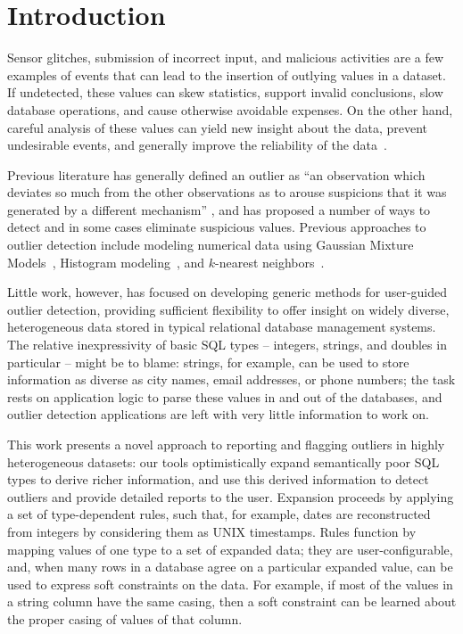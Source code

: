 \section{Introduction}
\label{sec:intro}

Sensor glitches, submission of incorrect input, and malicious activities are a few examples of events that can lead to the insertion of outlying values in a dataset. If undetected, these values can skew statistics, support invalid conclusions, slow database operations, and cause otherwise avoidable expenses. On the other hand, careful analysis of these values can yield new insight about the data, prevent undesirable events, and generally improve the reliability of the data~\cite{Achour2014}.

Previous literature has generally defined an outlier as ``an observation which deviates so much from the other observations as to arouse suspicions that it was generated by a different mechanism'' \cite{Hawkins1980}, and has proposed a number of ways to detect and in some cases eliminate suspicious values. Previous approaches to outlier detection include modeling numerical data using Gaussian Mixture Models~\cite{Lu2005,Roberts1994,Roberts1999}, Histogram modeling~\cite{Gebski2007,Sheng2007}, and $k$-nearest neighbors~\cite{Ramaswamy2000}.

Little work, however, has focused on developing generic methods for user-guided outlier detection, providing sufficient flexibility to offer insight on widely diverse, heterogeneous data stored in typical relational database management systems. The relative inexpressivity of basic SQL types -- integers, strings, and doubles in particular -- might be to blame: strings, for example, can be used to store information as diverse as city names, email addresses, or phone numbers; the task rests on application logic to parse these values in and out of the databases, and outlier detection applications are left with very little information to work on.

This work presents a novel approach to reporting and flagging outliers in highly heterogeneous datasets: our tools optimistically expand semantically poor SQL types to derive richer information, and use this derived information to detect outliers and provide detailed reports to the user. Expansion proceeds by applying a set of type-dependent rules, such that, for example, dates are reconstructed from integers by considering them as UNIX timestamps. Rules function by mapping values of one type to a set of expanded data; they are user-configurable, and, when many rows in a database agree on a particular expanded value, can be used to express soft constraints on the data. For example, if most of the values in a string column have the same casing, then a soft constraint can be learned about the proper casing of values of that column.

